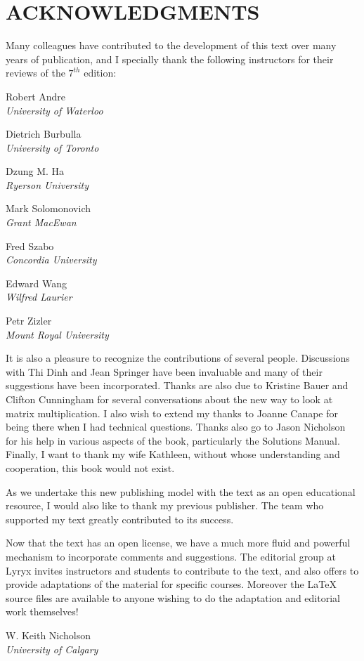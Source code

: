 \section*{ACKNOWLEDGMENTS}

Many colleagues have contributed to the development of this text over many years of publication, and I specially thank the following instructors for their reviews of the $7^{th}$ edition:


Robert Andre\\
\hspace*{3em}\textit{University of Waterloo}

Dietrich Burbulla\\
\hspace*{3em}\textit{University of Toronto}

Dzung M. Ha\\
\hspace*{3em}\textit{Ryerson University}

Mark Solomonovich\\
\hspace*{3em}\textit{Grant MacEwan}

Fred Szabo\\
\hspace*{3em}\textit{Concordia University}

Edward Wang\\
\hspace*{3em}\textit{Wilfred Laurier}

Petr Zizler\\
\hspace*{3em}\textit{Mount Royal University}

It is also a pleasure to recognize the contributions of several people. Discussions with Thi Dinh and Jean Springer have been invaluable and many of their suggestions have been incorporated. Thanks are also due to Kristine Bauer and Clifton Cunningham for several conversations about the new way to look at matrix multiplication. I also wish to extend my thanks to Joanne Canape for being there when I had technical questions. Thanks also go to Jason Nicholson for his help in various aspects of the book, particularly the Solutions Manual. Finally, I want to thank my wife Kathleen, without whose understanding and cooperation, this book would not exist.

As we undertake this new publishing model with the text as an open educational resource, I would also like to thank my previous publisher. The team who supported my text greatly contributed to its success. 

Now that the text has an open license, we have a much more fluid and powerful mechanism to incorporate comments and suggestions. The editorial group at Lyryx invites instructors and students to contribute to the text, and also offers to provide adaptations of the material for specific courses. Moreover the LaTeX source files are available to anyone wishing to do the adaptation and editorial work themselves!

W. Keith Nicholson \\
\hspace*{3em}\textit{University of Calgary}
